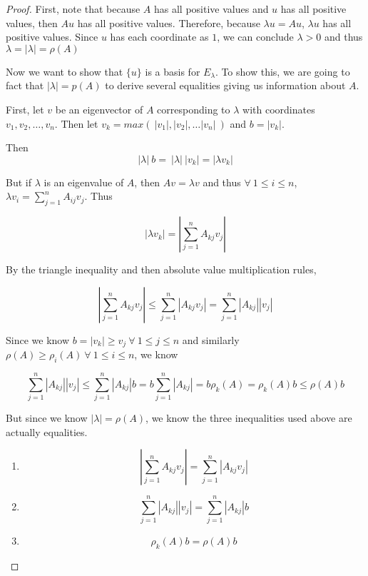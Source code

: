\documentclass{amsart}
\theoremstyle{definition}
\theoremstyle{remark}
\numberwithin{equation}{section}
\begin{document}
\begin{proof}
First, note that because $A$ has all positive values and $u$ has all positive values, then $Au$ has all positive values. Therefore, because $\lambda u = Au$, $\lambda u$ has all positive values.
Since $u$ has each coordinate as $1$, we can conclude $\lambda > 0$ and thus $\lambda = |\lambda| = \rho(A)$

Now we want to show that $\{ u \}$ is a basis for $E_{\lambda}$.
To show this, we are going to fact that $|\lambda| = p(A)$ to derive several equalities giving us information about $A$.

First, let $v$ be an eigenvector of $A$ corresponding to $\lambda$ with coordinates $v_1, v_2, \ldots, v_n$.  
Then let $v_k = max(\ |v_1|, |v_2|, \ldots |v_n|\ )$ and $b = |v_k|$.

Then $$ |\lambda|\ b =\ |\lambda|\ |v_k| = |\lambda v_k| $$

But if $\lambda$ is an eigenvalue of $A$, then $Av = \lambda v$ and thus $\forall\ 1 \leq i \leq n$, $\lambda v_i = \sum_{j = 1}^n A_{ij}v_j$.
Thus

$$ |\lambda v_k| = | \sum_{j = 1}^n A_{kj}v_j | $$

By the triangle inequality and then absolute value multiplication rules,

$$ | \sum_{j = 1}^n A_{kj}v_j | \leq \sum_{j=1}^n |A_{kj}v_j| = \sum_{j=1}^n |A_{kj}| |v_j| $$

Since we know $b = |v_k| \geq v_j\ \forall\ 1 \leq j \leq n$ and similarly $\rho(A) \geq  \rho_i(A)\ \forall\ 1 \leq i \leq n $, we know 

$$ \sum_{j=1}^n |A_{kj}| |v_j|  \leq \sum_{j=1}^n |A_{kj}| b = b \sum_{j=1}^n |A_{kj}| =  b\rho_k(A) = \rho_k(A)b \leq \rho(A)b $$


But since we know $|\lambda| = \rho(A)$, we know the three inequalities used above are actually equalities.

\begin{enumerate}

	\item $$| \sum_{j = 1}^n A_{kj}v_j | = \sum_{j=1}^n |A_{kj}v_j|$$

	\item $$\sum_{j=1}^n |A_{kj}| |v_j|  = \sum_{j=1}^n |A_{kj}| b$$

	\item $$\rho_k(A)b = \rho(A)b$$ \newline

\end{enumerate}




\end{proof}
\end{document}
